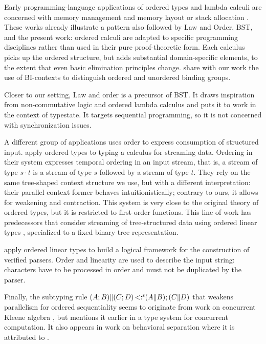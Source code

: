 Early programming-language applications of ordered types and lambda
calculi are concerned with memory management and memory layout
\cite{DBLP:conf/popl/PetersenHCP03} or stack allocation
\cite{DBLP:conf/tldi/AhmedW03}. These works already illustrate a
pattern also followed by Law and Order, BST, and the present work:
ordered calculi are adapted to specific programming disciplines rather
than used in their pure proof-theoretic form. Each calculus picks up
the ordered structure, but adds substantial domain-specific elements,
to the extent that even basic elimination principles change.
\citet{DBLP:conf/tldi/AhmedW03} share with our work the use of
BI-contexts to distinguish ordered and unordered binding groups.

Closer to our setting, Law and order
\cite{DBLP:journals/pacmpl/Saffrich0024} is a precursor of BST. It
draws inspiration from non-commutative logic and ordered lambda
calculus and puts it to work in the context of typestate. It targets
sequential programming, so it is not concerned with synchronization
issues.

A different group of applications uses order to express consumption of
structured input. \citet{DBLP:journals/pacmpl/CutlerWNHGSP24} apply
ordered types to typing a calculus for streaming data. Ordering in
their system expresses temporal ordering in an input stream, that is, a
stream of type $s\cdot t$ is a stream of type $s$ followed by a stream
of type $t$. They rely on the same tree-shaped context structure we use, but with a
different interpretation: their parallel context former behaves
intuitionistically; contrary to ours, it allows for weakening and
contraction. This system is very close to the original theory of
ordered types, but it is restricted to first-order functions. This
line of work has predecessors that consider streaming of
tree-structured data using ordered linear types
\cite{DBLP:journals/jfp/KodamaSK08,DBLP:journals/jip/SatoSK11},
specialized to a fixed binary tree representation.

\citet{DBLP:journals/pacmpl/SchaeferVAN25} apply ordered linear
types to build a logical framework for the construction of verified
parsers. Order and linearity are used to describe the input string:
characters have to be processed in order and must not be duplicated by
the parser.

Finally, the subtyping rule
$(A;B) \| (C;D) \operatorname{<:^s} (A \| B) ; (C \| D)$ that weakens
parallelism for ordered sequentiality seems to
originate from work on concurrent Kleene algebra
\cite{DBLP:conf/concur/HoareMSW09}, but \citet{CAIRES2008120} mentions it
earlier in a type system for concurrent computation. It also appears
in work on behavioral separation \cite{DBLP:conf/popl/CairesS13} where
it is attributed to \citet{DBLP:journals/tcs/BloomE96a}.

